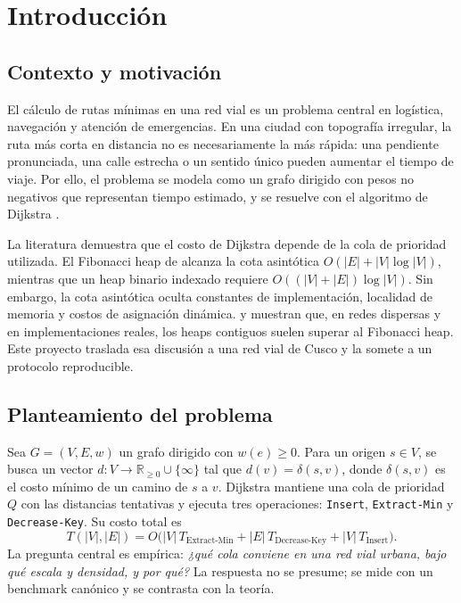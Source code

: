 \section{Introducción}
\label{sec:introduccion}

\subsection{Contexto y motivación}
El cálculo de rutas mínimas en una red vial es un problema central en logística, navegación y atención de emergencias. En una ciudad con topografía irregular, la ruta más corta en distancia no es necesariamente la más rápida: una pendiente pronunciada, una calle estrecha o un sentido único pueden aumentar el tiempo de viaje. Por ello, el problema se modela como un grafo dirigido con pesos no negativos que representan tiempo estimado, y se resuelve con el algoritmo de Dijkstra \parencite{dijkstra1959note}.

La literatura demuestra que el costo de Dijkstra depende de la cola de prioridad utilizada. El Fibonacci heap de \textcite{fredman1987fibonacci} alcanza la cota asintótica $O(|E|+|V|\log |V|)$, mientras que un heap binario indexado requiere $O((|V|+|E|)\log |V|)$. Sin embargo, la cota asintótica oculta constantes de implementación, localidad de memoria y costos de asignación dinámica. \textcite{cherkassky1996shortest} y \textcite{lamarca1996cache} muestran que, en redes dispersas y en implementaciones reales, los heaps contiguos suelen superar al Fibonacci heap. Este proyecto traslada esa discusión a una red vial de Cusco y la somete a un protocolo reproducible.

\subsection{Planteamiento del problema}
Sea $G=(V,E,w)$ un grafo dirigido con $w(e)\ge 0$. Para un origen $s\in V$, se busca un vector $d:V\to\mathbb{R}_{\ge 0}\cup\{\infty\}$ tal que $d(v)=\delta(s,v)$, donde $\delta(s,v)$ es el costo mínimo de un camino de $s$ a $v$. Dijkstra mantiene una cola de prioridad $Q$ con las distancias tentativas y ejecuta tres operaciones: \texttt{Insert}, \texttt{Extract-Min} y \texttt{Decrease-Key}. Su costo total es
\begin{equation}
    T(|V|,|E|)=O\bigl(|V|\,T_{\text{Extract-Min}}+|E|\,T_{\text{Decrease-Key}}+|V|\,T_{\text{Insert}}\bigr).
    \label{eq:costo_dijkstra}
\end{equation}
La pregunta central es empírica: \emph{¿qué cola conviene en una red vial urbana, bajo qué escala y densidad, y por qué?} La respuesta no se presume; se mide con un benchmark canónico y se contrasta con la teoría.

